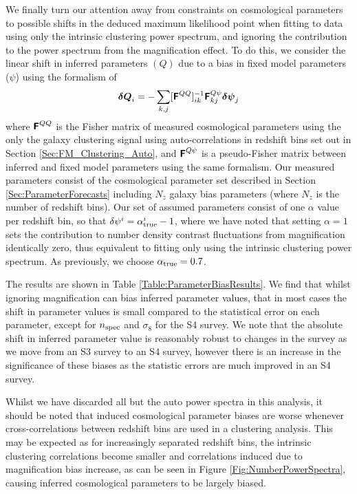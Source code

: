 \documentclass[useAMS,usenatbib,times,letter,amssymb]{mn2e}
\def\be{\begin{equation}}
\def\ee{\end{equation}}
\def\ATrue{0.7}
\newcommand{\bm}[1]{\mbox{\boldmath{$#1$}}}   %
\begin{document}
We finally turn our attention away from constraints on cosmological parameters to possible shifts in the deduced maximum likelihood point when fitting to data using only the intrinsic clustering power spectrum, and ignoring the contribution to the power spectrum from the magnification effect. To do this, we consider the linear shift in inferred parameters $(Q)$ due to a bias in fixed model parameters ($\psi$) using the formalism of \cite{Taylor:2007p1037}
\be\label{eqn:ParameterBias}
\bm{\delta Q}_i = -\sum_{k,j}[\mathbfss{F}^{QQ}]^{-1}_{ik}\mathbfss{F}^{Q\psi}_{kj}\bm{\delta \psi}_j
\ee
where $\textbf{\textsf{F}}^{QQ}$ is the Fisher matrix of measured  cosmological parameters using the only the galaxy clustering signal using auto-correlations in redshift bins set out in Section \ref{Sec:FM_Clustering_Auto},  and $\textbf{\textsf{F}}^{Q\psi}$ is a pseudo-Fisher matrix between inferred and fixed model parameters using the same formalism. Our measured parameters consist of the cosmological parameter set described in Section \ref{Sec:ParameterForecasts} including $N_z$ galaxy bias parameters (where $N_z$ is the number of redshift bins). Our set of assumed parameters consist of one $\alpha$ value per redshift bin, so that $\delta \psi^i = \alpha^i_{\rm true} -  1$, where we have noted that  setting $\alpha = 1$ sets the contribution to number density contrast fluctuations from magnification identically zero, thus equivalent to fitting only using the intrinsic clustering power spectrum. As previously, we choose $\alpha_{\rm true} = \ATrue$.

The results are shown in Table \ref{Table:ParameterBiasResults}. We find that whilst ignoring magnification can bias inferred parameter values, that in most cases the shift in parameter values is small compared to the statistical error on each parameter, except for $n_{\rm spec}$ and $\sigma_8$ for the S4 survey. We note that the absolute shift in inferred parameter value is reasonably robust to changes in the survey as we move from an S3 survey to an S4 survey, however there is an increase in the significance of these biases as the statistic errors are much improved in an S4 survey.

Whilst we have discarded all but the auto power spectra in this analysis, it should be noted that induced cosmological parameter biases are worse whenever cross-correlations between redshift bins are used in a clustering analysis. This may be expected as for increasingly separated redshift bins, the intrinsic clustering correlations become smaller and correlations induced due to magnification bias increase, as can be seen in Figure \ref{Fig:NumberPowerSpectra}, causing inferred cosmological parameters to be largely biased. 
\end{document}
